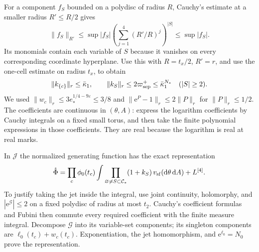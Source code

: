 \documentclass[11pt,letterpaper,reqno]{amsart}
\newcommand{\dd}{\mathrm d}
\begin{document}
For a component $f_S$ bounded on a polydisc
of radius $R$, Cauchy's estimate at a smaller
radius $R'\le R/2$ gives
\[
 \|f_S\|_{R'}\le\sup|f_S|
             \left(\sum_{j=1}^4(R'/R)^j\right)^{|S|}
                         \le\sup|f_S|.
\]
Its monomials contain each variable of $S$
because it vanishes on every corresponding
coordinate hyperplane. Use this with
$R=t_x/2$, $R'=r$, and use the one-cell
estimate on radius $t_x$, to obtain
\begin{equation}\label{eq:interacting-error-jets}
 \|k_{\{c\}}\|_r\le\bar\kappa_1,\qquad
 \|k_S\|_r\le2\varpi_{\rm sep}^+
                       \le\bar\kappa_1^{N_*}\quad(|S|\ge2).
\end{equation}
We used $\|w_c\|_r\le3e_*^{1/4-9\varepsilon}\le3/8$
and $\|\mathrm e^P-1\|_r\le2\|P\|_r$ for $\|P\|_r\le1/2$.
The coefficients are continuous in $(\theta,A)$:
express the logarithm coefficients by Cauchy
integrals on a fixed small torus, and then
take the finite polynomial expressions in
those coefficients. They are real because
the logarithm is real at real marks.

In $\mathcal J$ the normalized generating
function has the exact representation
\begin{equation}\label{eq:interacting-jet-representation}
 \mathring\Phi=
   \prod_c\phi_0(t_c)
       \int\prod_{\varnothing\ne S\subset\mathcal C_*}
                         (1+k_S)\,v_{\rm sf}(\dd\theta\,\dd A)
       +L^{[4]}.
\end{equation}
To justify taking the jet inside the integral,
use joint continuity, holomorphy, and
$|\mathrm e^{\mathcal G}|\le2$ on a fixed
polydisc of radius at most $t_2$.
Cauchy's coefficient formulas and Fubini
then commute every required coefficient
with the finite measure integral.
Decompose $\mathcal G$ into its variable-set
components; its singleton components are
$\ell_0(t_c)+w_c(t_c)$.
Exponentiation, the jet homomorphism,
and $\mathrm e^{\ell_0}=N_0$ prove the representation.
\end{document}

